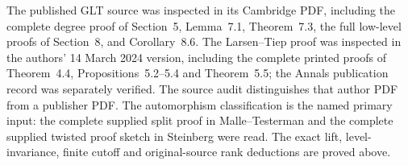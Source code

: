 The published GLT source was inspected in its Cambridge
PDF, including the complete degree proof of Section~5,
Lemma~7.1, Theorem~7.3, the full low-level proofs of
Section~8, and Corollary~8.6. The Larsen--Tiep proof
was inspected in the authors' 14 March 2024 version,
including the complete printed proofs of Theorem~4.4,
Propositions~5.2--5.4 and Theorem~5.5; the Annals publication
record was separately verified. The source audit
distinguishes that author PDF from a publisher PDF.
The automorphism classification is the named primary
input: the complete supplied split proof in
Malle--Testerman and the complete supplied twisted
proof sketch in Steinberg were read. The exact lift,
level-invariance, finite cutoff and original-source
rank deductions are proved above.
